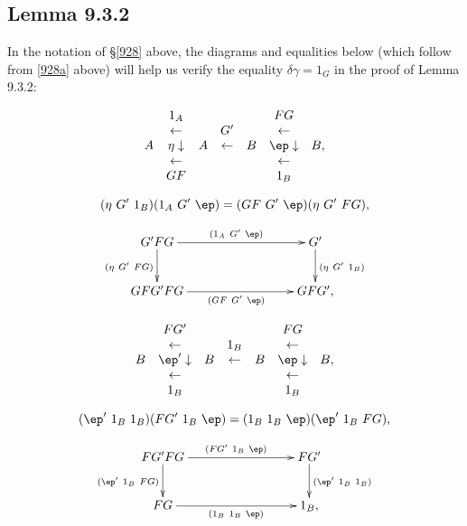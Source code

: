 \documentclass[12pt]{article}
\begin{document}

\newpage

\subsection{Lemma 9.3.2}\label{932}

In the notation of \S\ref{928} above, the diagrams and equalities below (which follow from \eqref{928a} above) will help us verify the equality $\delta\gamma=1_G$ in the proof of Lemma 9.3.2:


$$
\begin{array}{ccccccc}
&1_A&&&&FG\\
&\leftarrow&&G'&&\leftarrow\\
A&\eta\downarrow&A&\leftarrow&B&\ep\downarrow&B,\\
&\leftarrow&&&&\leftarrow\\
&GF&&&&1_B
\end{array}
$$ 

\begin{equation}\label{928c}
(\eta\ G'\ 1_B)(1_A\ G'\ \ep)=(GF\ G'\ \ep)(\eta\ G'\ FG),
\end{equation}

$$
\xymatrix{
G'FG\ar[rrr]^{(1_A\ G'\ \ep)}\ar[d]_{(\eta\ G'\ FG)}&&&G'\ar[d]^{(\eta\ G'\ 1_B)}\\ 
GFG'FG\ar[rrr]_{(GF\ G'\ \ep)}&&&GFG',}
$$

$$
\begin{array}{ccccccc}
&FG'&&&&FG\\
&\leftarrow&&1_B&&\leftarrow\\
B&\ep'\downarrow&B&\leftarrow&B&\ep\downarrow&B,\\
&\leftarrow&&&&\leftarrow\\
&1_B&&&&1_B
\end{array}
$$

\begin{equation}\label{928d}
(\ep'\ 1_B\ 1_B)(FG'\ 1_B\ \ep)=(1_B\ 1_B\ \ep)(\ep'\ 1_B\ FG),
\end{equation}

$$
\xymatrix{
FG'FG\ar[rrr]^{(FG'\ 1_B\ \ep)}\ar[d]_{(\ep'\ 1_B\ FG)}&&&FG'\ar[d]^{(\ep'\ 1_B\ 1_B)}\\ 
FG\ar[rrr]_{(1_B\ 1_B\ \ep)}&&&1_B,}
$$ 

\newpage
\end{document}
